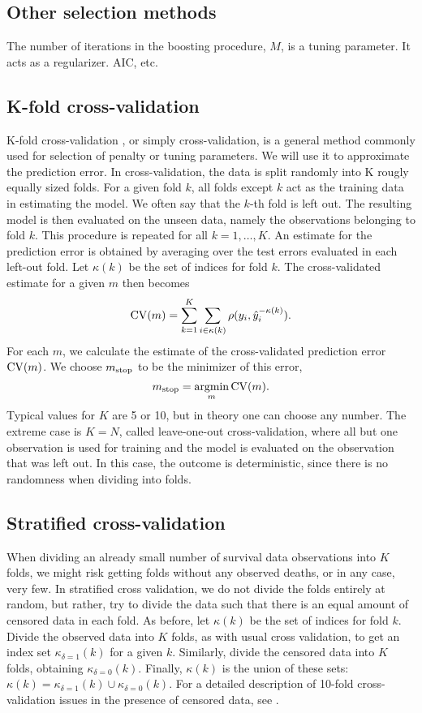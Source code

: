 \subsection{Other selection methods}
The number of iterations in the boosting procedure, $M$, is a tuning parameter. It acts as a regularizer. AIC, etc.

\subsection{K-fold cross-validation}\label{subsec:K-fold}
K-fold cross-validation \citep{lachenbruch}, or simply cross-validation, is a general method commonly used for selection of penalty or tuning parameters. We will use it to approximate the prediction error. In cross-validation, the data is split randomly into K rougly equally sized folds. For a given fold $k$, all folds except $k$ act as the training data in estimating the model. We often say that the $k$-th fold is left out. The resulting model is then evaluated on the unseen data, namely the observations belonging to fold $k$. This procedure is repeated for all $k=1,\ldots,K$. An estimate for the prediction error is obtained by averaging over the test errors evaluated in each left-out fold. Let $\kappa(k)$ be the set of indices for fold $k$. The cross-validated estimate for a given $m$ then becomes
\begin{equation}
    \operatorname{CV}(m)=\sum_{k=1}^K\sum_{i\in\kappa(k)}\rho(y_i,\hat{y}_i^{-\kappa(k)}).
\end{equation}
For each $m$, we calculate the estimate of the cross-validated prediction error $\operatorname{CV}(m)$. We choose $m_{\text{stop}}$ to be the minimizer of this error,
\begin{equation}
    m_{\text{stop}}=\operatorname*{argmin}_{m}\operatorname{CV}(m).
\end{equation}
Typical values for $K$ are 5 or 10, but in theory one can choose any number. The extreme case is $K=N$, called leave-one-out cross-validation, where all but one observation is used for training and the model is evaluated on the observation that was left out. In this case, the outcome is deterministic, since there is no randomness when dividing into folds.

\subsection{Stratified cross-validation}
When dividing an already small number of survival data observations into $K$ folds, we might risk getting folds without any observed deaths, or in any case, very few. In stratified cross validation, we do not divide the folds entirely at random, but rather, try to divide the data such that there is an equal amount of censored data in each fold.
As before, let $\kappa(k)$ be the set of indices for fold $k$. Divide the observed data into $K$ folds, as with usual cross validation, to get an index set $\kappa_{\delta=1}(k)$ for a given $k$. Similarly, divide the censored data into $K$ folds, obtaining $\kappa_{\delta=0}(k)$. Finally, $\kappa(k)$ is the union of these sets: $\kappa(k)=\kappa_{\delta=1}(k)\cup\kappa_{\delta=0}(k)$.
For a detailed description of 10-fold cross-validation issues in the presence of censored data, see \citet{kohavi}.

